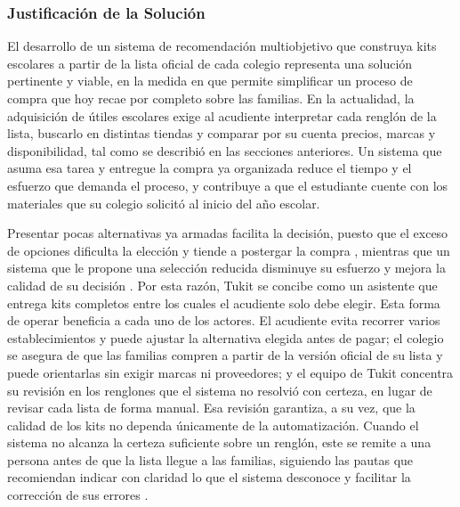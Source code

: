 \subsubsection{Justificación de la Solución}

El desarrollo de un sistema de recomendación multiobjetivo que construya kits escolares a
partir de la lista oficial de cada colegio representa una solución pertinente y viable, en
la medida en que permite simplificar un proceso de compra que hoy recae por completo sobre
las familias. En la actualidad, la adquisición de útiles escolares exige al acudiente
interpretar cada renglón de la lista, buscarlo en distintas tiendas y comparar por su cuenta
precios, marcas y disponibilidad, tal como se describió en las secciones anteriores. Un
sistema que asuma esa tarea y entregue la compra ya organizada reduce el tiempo y el
esfuerzo que demanda el proceso, y contribuye a que el estudiante cuente con los materiales
que su colegio solicitó al inicio del año escolar.\par

Presentar pocas alternativas ya armadas facilita la decisión, puesto que el exceso de
opciones dificulta la elección y tiende a postergar la compra \citep{iyengar_when_2000},
mientras que un sistema que le propone una
selección reducida disminuye su esfuerzo y mejora la calidad de su decisión
\citep{haubl_consumer_2000}. Por esta razón, Tukit se concibe como un asistente que entrega kits completos entre los cuales el acudiente
solo debe elegir. Esta forma de operar beneficia a cada uno de los actores. El acudiente
evita recorrer varios establecimientos y puede ajustar la alternativa elegida antes de
pagar; el colegio se asegura de que las familias compren a partir de la versión oficial de
su lista y puede orientarlas sin exigir marcas ni proveedores; y el equipo de Tukit concentra su revisión en los
renglones que el sistema no resolvió con certeza, en lugar de revisar cada lista de forma
manual. Esa revisión garantiza, a su vez, que la calidad de los kits no dependa únicamente
de la automatización. Cuando el sistema no alcanza la certeza suficiente sobre un renglón,
este se remite a una persona antes de que la lista llegue a las familias, siguiendo las
pautas que recomiendan indicar con claridad lo que el sistema desconoce y facilitar la
corrección de sus errores \citep{amershi_guidelines_2019}. 

